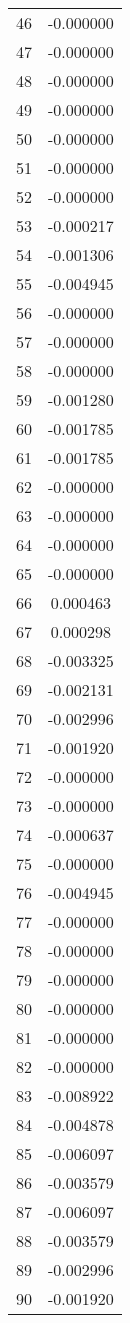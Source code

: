 \documentclass[12pt]{article}
\begin{document}
\begin{longtable}{@{}cc@{}}
46 & -0.000000 \\
47 & -0.000000 \\
48 & -0.000000 \\
49 & -0.000000 \\
50 & -0.000000 \\
51 & -0.000000 \\
52 & -0.000000 \\
53 & -0.000217 \\
54 & -0.001306 \\
55 & -0.004945 \\
56 & -0.000000 \\
57 & -0.000000 \\
58 & -0.000000 \\
59 & -0.001280 \\
60 & -0.001785 \\
61 & -0.001785 \\
62 & -0.000000 \\
63 & -0.000000 \\
64 & -0.000000 \\
65 & -0.000000 \\
66 & 0.000463 \\
67 & 0.000298 \\
68 & -0.003325 \\
69 & -0.002131 \\
70 & -0.002996 \\
71 & -0.001920 \\
72 & -0.000000 \\
73 & -0.000000 \\
74 & -0.000637 \\
75 & -0.000000 \\
76 & -0.004945 \\
77 & -0.000000 \\
78 & -0.000000 \\
79 & -0.000000 \\
80 & -0.000000 \\
81 & -0.000000 \\
82 & -0.000000 \\
83 & -0.008922 \\
84 & -0.004878 \\
85 & -0.006097 \\
86 & -0.003579 \\
87 & -0.006097 \\
88 & -0.003579 \\
89 & -0.002996 \\
90 & -0.001920 \\

\end{longtable}
\end{document}
